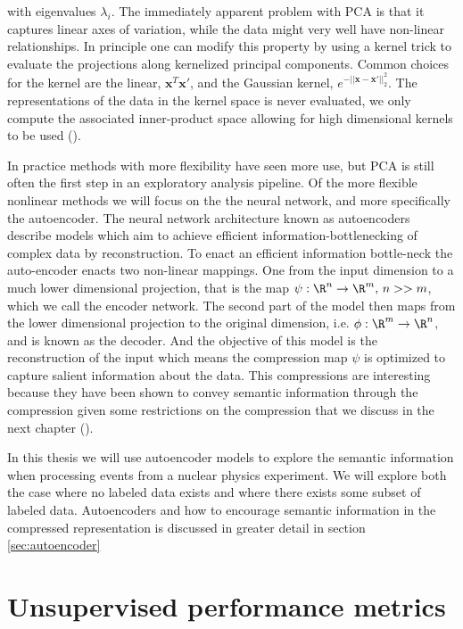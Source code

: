 \noindent with eigenvalues $\lambda_i$. The immediately apparent problem with PCA is that it captures linear axes of variation, while the data might very well have non-linear relationships. In principle one can modify this property by using a kernel trick to evaluate the projections along kernelized principal components. Common choices for the kernel are the linear, $\mathbf{x}^T\mathbf{x}'$, and the Gaussian kernel, $e^{-||\mathbf{x} - \mathbf{x}'||^2_2}$. The representations of the data in the kernel space is never evaluated, we only compute the associated inner-product space allowing for high dimensional kernels to be used (\cite{Scholkopf1996}). 

In practice methods with more flexibility have seen more use, but PCA is still often the first step in an exploratory analysis pipeline. Of the more flexible nonlinear methods we will focus on the the neural network, and more specifically the autoencoder. The neural network architecture known as autoencoders describe models which aim to achieve efficient information-bottlenecking of complex data by reconstruction. To enact an efficient information bottle-neck the auto-encoder enacts two non-linear mappings. One from the input dimension to a much lower dimensional projection, that is the map $\psi: \R^n \rightarrow \R^m,\, n >> m$, which we call the encoder network. The second part of the model then maps from the lower dimensional projection to the original dimension, i.e. $\phi: \R^m \rightarrow \R^n$, and is known as the decoder. And the objective of this model is the reconstruction of the input which means the compression map $\psi$ is optimized to capture salient information about the data. This compressions are interesting because they have been shown to convey semantic information through the compression given some restrictions on the compression that we discuss in the next chapter (\cite{Fertig}).

In this thesis we will use autoencoder models to explore the semantic information when processing events from a nuclear physics experiment. We will explore both the case where no labeled data exists and where there exists some subset of labeled data. Autoencoders and how to encourage semantic information in the compressed representation is discussed in greater detail in section \ref{sec:autoencoder}

\section{Unsupervised performance metrics}\label{sec:unsupervised_perf}

